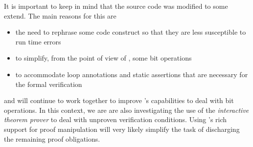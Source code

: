 It is important to keep in mind that the source code was modified to some extend.
The main reasons for this are
\begin{itemize}
\item the need to rephrase some code construct so that they are less susceptible to run time errors
\item to simplify, from the point of view of \framacwp, some bit operations
\item to accommodate loop annotations and static assertions that
      are necessary for the formal verification
\end{itemize}

\fokus and \cealist will continue to work together to improve \framacwp's
capabilities to deal with bit operations.
In this context, we are are also investigating the use of the
\emph{interactive theorem prover} \coq to deal with unproven verification conditions.
Using \coq's rich support for proof manipulation will very likely
simplify the task of discharging the remaining proof obligations.

